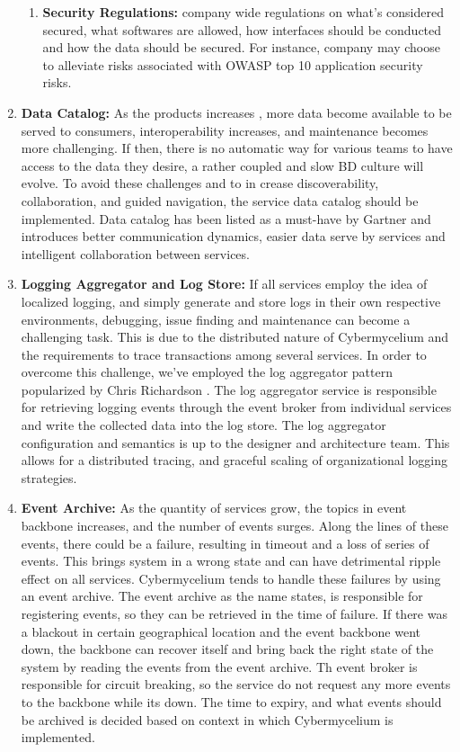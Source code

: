 \documentclass[review]{elsarticle}
\begin{document}
\begin{enumerate}
\begin{enumerate}
        \item \textbf{Security Regulations:} company wide regulations on what's considered secured, what softwares are allowed, how interfaces should be conducted and how the data should be secured. For instance, company may choose to alleviate risks associated with OWASP top 10 application security risks.
    \end{enumerate}
    \item \textbf{Data Catalog:} As the products increases , more data become available to be served to consumers, interoperability increases, and maintenance becomes more challenging. If then, there is no automatic way for various teams to have access to the data they desire, a rather coupled and slow BD culture will evolve. To avoid these challenges and to in crease discoverability, collaboration, and guided navigation, the service data catalog should be implemented. Data catalog has been listed as a must-have by Gartner \cite{GartnerDataCatalog} and introduces better communication dynamics, easier data serve by services and intelligent collaboration between services.
    \item \textbf{Logging Aggregator and Log Store:} If all services employ the idea of localized logging, and simply generate and store logs in their own respective environments, debugging, issue finding and maintenance can become a challenging task. This is due to the distributed nature of Cybermycelium and the requirements to trace transactions among several services. In order to overcome this challenge, we've employed the log aggregator pattern popularized by Chris Richardson \cite{MicroServicesPatterns}. The log aggregator service is responsible for retrieving logging events through the event broker from individual services and write the collected data into the log store. The log aggregator configuration and semantics is up to the designer and architecture team. This allows for a distributed tracing, and graceful scaling of organizational logging strategies.
    \item \textbf{Event Archive:} As the quantity of services grow, the topics in event backbone increases, and the number of events surges. Along the lines of these events, there could be a failure, resulting in timeout and a loss of series of events. This brings system in a wrong state and can have detrimental ripple effect on all services. Cybermycelium tends to handle these failures by using an event archive. The event archive as the name states, is responsible for registering events, so they can be retrieved in the time of failure. If there was a blackout in certain geographical location and the event backbone went down, the backbone can recover itself and bring back the right state of the system by reading the events from the event archive. Th event broker is responsible for circuit breaking, so the service do not request any more events to the backbone while its down. The time to expiry, and what events should be archived is decided based on context in which Cybermycelium is implemented.

\end{enumerate}
\end{document}
